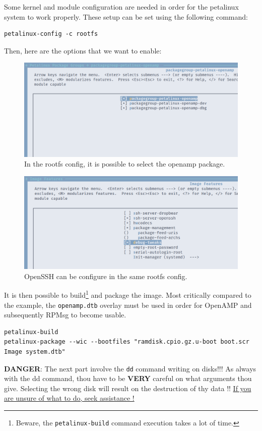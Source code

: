 \documentclass[10pt]{article}
\begin{document}
Some kernel and module configuration are needed in order for the petalinux system to work properly.
These setup can be set using the following command:
\begin{verbatim}
petalinux-config -c rootfs
\end{verbatim}

Then, here are the options that we want to enable:
\begin{figure}[htbp]
\centering
\includegraphics[width=.6\textwidth]{./img/yocto_openamp.png}
\caption{\label{fig:orgbf78932}In the rootfs config, it is possible to select the openamp package.}
\end{figure}


\begin{figure}[htbp]
\centering
\includegraphics[width=.6\textwidth]{./img/yocto_ssh.png}
\caption{\label{fig:org8a1a719}OpenSSH can be configure in the same rootfs config.}
\end{figure}

It is then possible to build\footnote{Beware, the \texttt{petalinux-build} command execution takes a lot of time.} and package the image. Most critically compared to the example,
the \texttt{openamp.dtb} overlay must be used in order for OpenAMP and subsequently RPMsg to become usable.
\begin{verbatim}
petalinux-build
petalinux-package --wic --bootfiles "ramdisk.cpio.gz.u-boot boot.scr Image system.dtb"
\end{verbatim}

\begin{tcolorbox}[colback=red!5!white,colframe=red!75!black]
\textbf{DANGER}: The next part involve the \texttt{dd} command writing on disks!!!
As always with the dd command, thou have to be \textbf{VERY} careful on what arguments
thou give. Selecting the wrong disk will result on the destruction of
thy data !!
\uline{If you are unsure of what to do, seek assistance !}
\end{tcolorbox}
\end{document}
